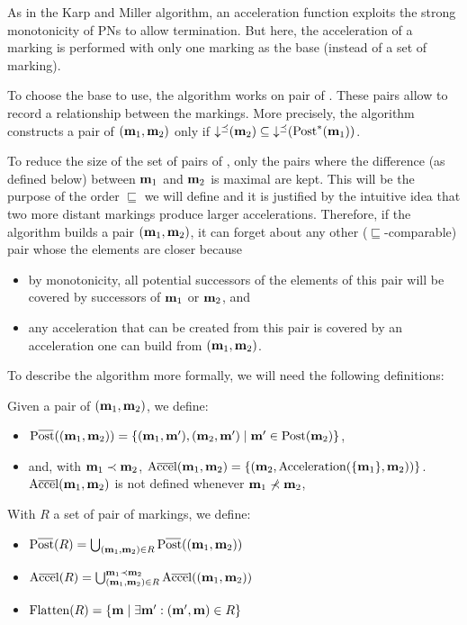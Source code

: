 As in the Karp and Miller algorithm, an acceleration function exploits the strong monotonicity of \acp{PN} to allow termination.
But here, the acceleration of a marking is performed with only one marking as the base (instead of a set of marking).

To choose the base to use, the algorithm works on pair of \omarks.
These pairs allow to record a relationship between the markings.
More precisely, the algorithm constructs a pair of \omarks $(\mathbf{m}_1, \mathbf{m}_2)$ only if $\operatorname{\downarrow^\preceq}(\mathbf{m}_2) \subseteq \operatorname{\downarrow^\preceq}(\operatorname{Post}^*(\mathbf{m}_1))$.

To reduce the size of the set of pairs of \omarks, only the pairs where the difference (as defined below) between $\mathbf{m}_1$ and $\mathbf{m}_2$ is maximal are kept.
This will be the purpose of the order $\sqsubseteq$ we will define and it is justified by the intuitive idea that two more distant markings produce larger accelerations.
Therefore, if the algorithm builds a pair $(\mathbf{m}_1, \mathbf{m}_2)$, it can forget about any other ($\sqsubseteq$-comparable) pair whose the elements are closer because
\begin{itemize}
  \item by monotonicity, all potential successors of the elements of this pair will be covered by successors of $\mathbf{m}_1$ or $\mathbf{m}_2$, and
  \item any acceleration that can be created from this pair is covered by an acceleration one can build from $(\mathbf{m}_1, \mathbf{m}_2)$.
\end{itemize}

To describe the algorithm more formally, we will need the following definitions:

Given a pair of \omarks $(\mathbf{m}_1, \mathbf{m}_2)$, we define:
\begin{itemize}
  \item $\Postb((\mar_1, \mar_2)) = \{(\mar_1, \marp), (\mar_2, \marp) \mid \marp \in \Post(\mar_2)\}$,
  \item and, with $\mathbf{m}_1 \prec \mathbf{m}_2$, $\operatorname{A\overline{cce}l}(\mathbf{m}_1, \mathbf{m}_2) = \{(\mathbf{m}_2, \operatorname{Acceleration}(\{\mathbf{m}_1\}, \mathbf{m}_2))\}$.
    $\operatorname{A\overline{cce}l}(\mathbf{m}_1, \mathbf{m}_2)$ is not defined whenever $\mathbf{m}_1 \nprec \mathbf{m}_2$,
\end{itemize}

With $R$ a set of pair of markings, we define:
\begin{itemize}
  \item $\Postb(R) = \bigcup_{(\mar_1, \mar_2) \in R} \Postb((\mar_1, \mar_2))$
  \item $\operatorname{A\overline{cce}l}(R) = \bigcup_{(\mathbf{m}_1, \mathbf{m}_2) \in R}^{\mathbf{m}_1 \prec \mathbf{m}_2} \operatorname{A\overline{cce}l}((\mathbf{m}_1, \mathbf{m}_2))$
  \item $\operatorname{Flatten}(R) = \{\mathbf{m} \mid \exists \mathbf{m'} : (\mathbf{m'}, \mathbf{m}) \in R\}$
\end{itemize}

